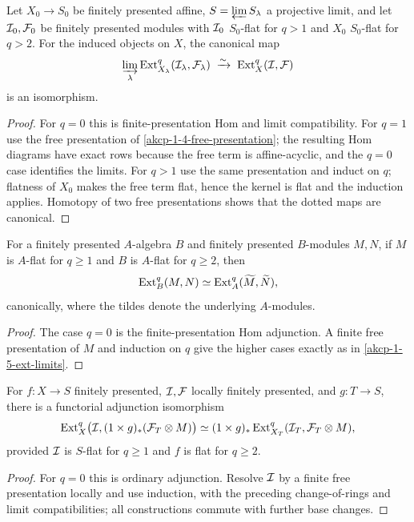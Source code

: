 \begin{lemma}
\label{akcp-1-5-ext-limits}
Let $X_0\to S_0$ be finitely presented affine, $S=\varprojlim S_\lambda$ a
projective limit, and let $\mathcal I_0,\mathcal F_0$ be finitely presented modules with
$\mathcal I_0$ $S_0$-flat for $q>1$ and $X_0$ $S_0$-flat for $q>2$.  For the induced
objects on $X$, the canonical map
\[
\varinjlim_\lambda\operatorname{Ext}^q_{X_\lambda}(\mathcal I_\lambda,\mathcal F_\lambda)
\;\xrightarrow{\sim}\;\operatorname{Ext}^q_X(\mathcal I,\mathcal F)
\]
is an isomorphism.
\end{lemma}
\begin{proof}
For $q=0$ this is finite-presentation Hom and limit compatibility.  For $q=1$
use the free presentation of \cref{akcp-1-4-free-presentation}; the resulting
Hom diagrams have exact rows because the free term is affine-acyclic, and the
$q=0$ case identifies the limits.  For $q>1$ use the same presentation and
induct on $q$; flatness of $X_0$ makes the free term flat, hence the kernel is
flat and the induction applies.  Homotopy of two free presentations shows that
the dotted maps are canonical.
\end{proof}

\begin{lemma}
\label{akcp-1-6-change-rings}
For a finitely presented $A$-algebra $B$ and finitely presented $B$-modules
$M,N$, if $M$ is $A$-flat for $q\ge1$ and $B$ is $A$-flat for $q\ge2$, then
\[
\operatorname{Ext}_B^q(M,N)\simeq\operatorname{Ext}_A^q(\widetilde M,\widetilde N),
\]
canonically, where the tildes denote the underlying $A$-modules.
\end{lemma}
\begin{proof}
The case $q=0$ is the finite-presentation Hom adjunction.  A finite free
presentation of $M$ and induction on $q$ give the higher cases exactly as in
\cref{akcp-1-5-ext-limits}.
\end{proof}

\begin{lemma}
\label{akcp-1-7-ext-adjunction}
For $f:X\to S$ finitely presented, $\mathcal I,\mathcal F$ locally finitely presented, and
$g:T\to S$, there is a functorial adjunction isomorphism
\[
\operatorname{Ext}^q_X\bigl(\mathcal I,(1\times g)_*(\mathcal F_T\otimes M)\bigr)
\simeq (1\times g)_*\operatorname{Ext}^q_{X_T}(\mathcal I_T,\mathcal F_T\otimes M),
\]
provided $\mathcal I$ is $S$-flat for $q\ge1$ and $f$ is flat for $q\ge2$.
\end{lemma}
\begin{proof}
For $q=0$ this is ordinary adjunction.  Resolve $\mathcal I$ by a finite free
presentation locally and use induction, with the preceding change-of-rings and
limit compatibilities; all constructions commute with further base changes.
\end{proof}

